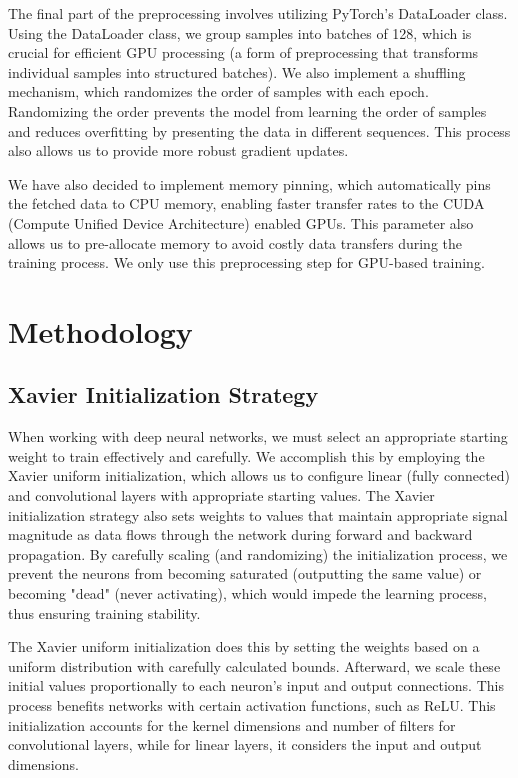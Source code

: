 \documentclass[12pt]{article}
\begin{document}
The final part of the preprocessing involves utilizing PyTorch's DataLoader class. Using the DataLoader class, we group samples into batches of 128, which is crucial for efficient GPU processing (a form of preprocessing that transforms individual samples into structured batches). We also implement a shuffling mechanism, which randomizes the order of samples with each epoch. Randomizing the order prevents the model from learning the order of samples and reduces overfitting by presenting the data in different sequences. This process also allows us to provide more robust gradient updates.

We have also decided to implement memory pinning, which automatically pins the fetched data to CPU memory, enabling faster transfer rates to the CUDA (Compute Unified Device Architecture) enabled GPUs. This parameter also allows us to pre-allocate memory to avoid costly data transfers during the training process. We only use this preprocessing step for GPU-based training.

\section*{Methodology}

\subsection*{Xavier Initialization Strategy}

When working with deep neural networks, we must select an appropriate starting weight to train effectively and carefully. We accomplish this by employing the Xavier uniform initialization, which allows us to configure linear (fully connected) and convolutional layers with appropriate starting values. The Xavier initialization strategy also sets weights to values that maintain appropriate signal magnitude as data flows through the network during forward and backward propagation. By carefully scaling (and randomizing) the initialization process, we prevent the neurons from becoming saturated (outputting the same value) or becoming "dead" (never activating), which would impede the learning process, thus ensuring training stability.

The Xavier uniform initialization does this by setting the weights based on a uniform distribution with carefully calculated bounds. Afterward, we scale these initial values proportionally to each neuron's input and output connections. This process benefits networks with certain activation functions, such as ReLU. This initialization accounts for the kernel dimensions and number of filters for convolutional layers, while for linear layers, it considers the input and output dimensions.
\end{document}
